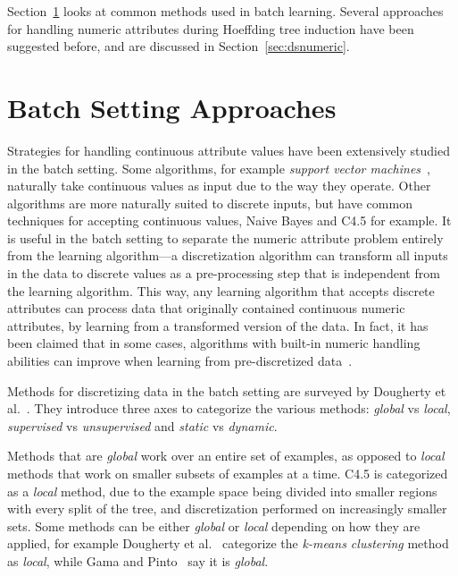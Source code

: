 Section~\ref{sec:batchnumeric} looks at common methods used in batch learning.
Several approaches for handling numeric attributes during Hoeffding tree induction have been suggested before, and are discussed in Section~\ref{sec:dsnumeric}. %

\section{Batch Setting Approaches}
\label{sec:batchnumeric}

Strategies for handling continuous attribute values have been extensively studied in the batch setting. Some algorithms, for example {\em support vector machines}~\cite{svm}, naturally take continuous values as input due to the way they operate. Other algorithms are more naturally suited to discrete inputs, but have common techniques for accepting continuous values, Naive Bayes and C4.5 for example. It is useful in the batch setting to separate the numeric attribute problem entirely from the learning algorithm---a discretization algorithm can transform all inputs in the data to discrete values as a pre-processing step that is independent from the learning algorithm. This way, any learning algorithm that accepts discrete attributes can process data that originally contained continuous numeric attributes, by learning from a transformed version of the data. In fact, it has been claimed that in some cases, algorithms with built-in numeric handling abilities can improve when learning from pre-discretized data~\cite{discretize}.

Methods for discretizing data in the batch setting are surveyed by Dougherty et al.~\cite{discretize}. They introduce three axes to categorize the various methods: {\em global} vs {\em local}, {\em supervised} vs {\em unsupervised} and {\em static} vs {\em dynamic}.

Methods that are {\em global} work over an entire set of examples, as opposed to {\em local} methods that work on smaller subsets of examples at a time. C4.5 is categorized as a {\em local} method, due to the example space being divided into smaller regions with every split of the tree, and discretization performed on increasingly smaller sets. Some methods can be either {\em global} or {\em local} depending on how they are applied, for example Dougherty et al.~\cite{discretize} categorize the {\em k-means clustering} method as {\em local}, while Gama and Pinto~\cite{discretizeds} say it is {\em global}.

